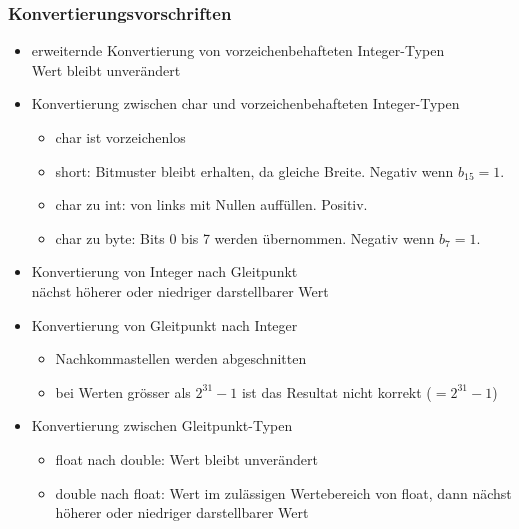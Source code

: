 \documentclass[a4paper,10pt]{article}
\begin{document}
\subsubsection{Konvertierungsvorschriften}
\begin{itemize}
	\item erweiternde Konvertierung von vorzeichenbehafteten Integer-Typen \\
		Wert bleibt unver\"andert
	\item Konvertierung zwischen char und vorzeichenbehafteten Integer-Typen
		\begin{itemize}
			\item char ist vorzeichenlos
			\item short: Bitmuster bleibt erhalten, da gleiche Breite. Negativ wenn $b_{15} = 1$. 
			\item char zu int: von links mit Nullen auff\"ullen. Positiv.
			\item char zu byte: Bits 0 bis 7 werden \"ubernommen. Negativ wenn $b_7 = 1$.
		\end{itemize}
	\item Konvertierung von Integer nach Gleitpunkt \\
		n\"achst h\"oherer oder niedriger darstellbarer Wert
	\item Konvertierung von Gleitpunkt nach Integer
		\begin{itemize}
			\item Nachkommastellen werden abgeschnitten
			\item bei Werten gr\"osser als $2^{31} - 1$ ist das Resultat nicht korrekt ($= 2^{31} - 1$)
		\end{itemize}
	\item Konvertierung zwischen Gleitpunkt-Typen
		\begin{itemize}
			\item float nach double: Wert bleibt unver\"andert
			\item double nach float: Wert im zul\"assigen Wertebereich von float, dann n\"achst h\"oherer oder niedriger darstellbarer Wert
		\end{itemize}
\end{itemize}
\end{document}
